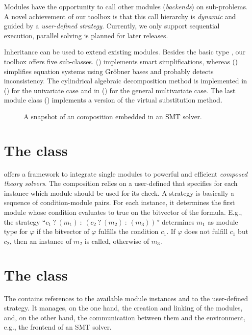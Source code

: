 Modules have the opportunity to call other modules (\emph{backends})
on sub-problems. A novel achievement of our toolbox is that this call
hierarchy is \emph{dynamic} and guided by a \emph{user-defined
  strategy}. Currently, we only support sequential execution, parallel
solving is planned for later releases.

Inheritance can be used to extend existing modules.
Besides the basic type \moduleClass, our toolbox offers
five sub-classes. \simplifierModuleClass
(\simplifierModule) implements smart simplifications, whereas
\groebnerModuleClass (\groebnerModule) simplifies equation systems 
using Gr\"obner bases and probably detects inconsistency. The 
cylindrical algebraic decomposition method is implemented in
\univariateCADModuleClass (\univariateCADModule) for the
univariate case and in \cadModuleClass (\CADModule) for the general
multivariate case. The last module class \vsModuleClass (\vsModule)
implements a version of the virtual substitution method.\smallskip

\begin{figure}[t]
\caption{A snapshot of an \smtrat composition embedded in an SMT solver.}
\begin{center}

\end{center}
\label{fig:framework}
\end{figure}

\section{The \strategyClass class}
\smtrat offers a framework to integrate
single modules to powerful and efficient \emph{composed theory solvers}. 
The composition relies on a user-defined 
\strategyClass that specifies for each
\formulaClass instance which module should be used for its check.  A strategy is basically a sequence
of condition-module pairs. For each \formulaClass instance, it determines the first
module whose condition evaluates to true on the bitvector of the formula.
E.g., the strategy
``$c_1\ ?\ (m_1)\ :\ (c_2\ ?\ (m_2)\ :\ (m_3))$''
determines $m_1$ as module type for $\varphi$
if the bitvector of $\varphi$ fulfills the condition $c_1$. If $\varphi$ does 
not fulfill $c_1$ but $c_2$, then an instance of $m_2$ is called,
otherwise of $m_3$.\smallskip

\section{The \managerClass class}
The \managerClass contains references to the available module
instances and to the user-defined strategy.  It manages, on the one
hand, the creation and linking of the modules, and, on the other hand,
the communication between them and the environment, e.g., the frontend of an
SMT solver. 

